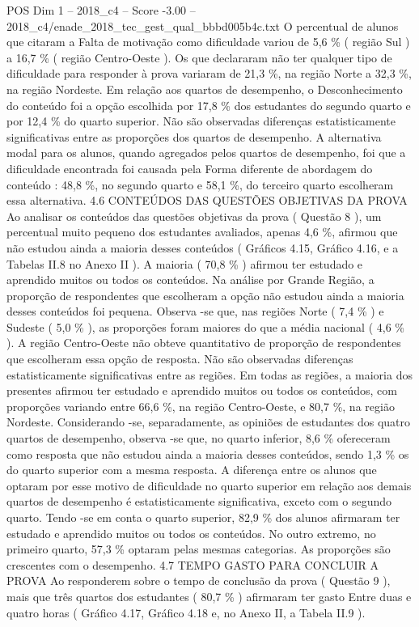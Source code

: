 \begin{textsample}{POS Dim 1 – 2018\_c4 – Score -3.00 – 2018\_c4/enade\_2018\_tec\_gest\_qual\_bbbd005b4c.txt}
O percentual de alunos que citaram a Falta de motivação como dificuldade variou de 5,6 \% ( região Sul ) a 16,7 \% ( região Centro-Oeste ).
Os que declararam não ter qualquer tipo de dificuldade para responder à prova variaram de 21,3 \%, na região Norte a 32,3 \%, na região Nordeste.
Em relação aos quartos de desempenho, o Desconhecimento do conteúdo foi a opção escolhida por 17,8 \% dos estudantes do segundo quarto e por 12,4 \% do quarto superior.
Não são observadas diferenças estatisticamente significativas entre as proporções dos quartos de desempenho.
A alternativa modal para os alunos, quando agregados pelos quartos de desempenho, foi que a dificuldade encontrada foi causada pela Forma diferente de abordagem do conteúdo : 48,8 \%, no segundo quarto e 58,1 \%, do terceiro quarto escolheram essa alternativa. 4.6 CONTEÚDOS DAS QUESTÕES OBJETIVAS DA PROVA Ao analisar os conteúdos das questões objetivas da prova ( Questão 8 ), um percentual muito pequeno dos estudantes avaliados, apenas 4,6 \%, afirmou que não estudou ainda a maioria desses conteúdos ( Gráficos 4.15, Gráfico 4.16, e a Tabelas II.8 no Anexo II ).
A maioria ( 70,8 \% ) afirmou ter estudado e aprendido muitos ou todos os conteúdos.
Na análise por Grande Região, a proporção de respondentes que escolheram a opção não estudou ainda a maioria desses conteúdos foi pequena.
Observa -se que, nas regiões Norte ( 7,4 \% ) e Sudeste ( 5,0 \% ), as proporções foram maiores do que a média nacional ( 4,6 \% ).
A região Centro-Oeste não obteve quantitativo de proporção de respondentes que escolheram essa opção de resposta.
Não são observadas diferenças estatisticamente significativas entre as regiões.
Em todas as regiões, a maioria dos presentes afirmou ter estudado e aprendido muitos ou todos os conteúdos, com proporções variando entre 66,6 \%, na região Centro-Oeste, e 80,7 \%, na região Nordeste.
Considerando -se, separadamente, as opiniões de estudantes dos quatro quartos de desempenho, observa -se que, no quarto inferior, 8,6 \% ofereceram como resposta que não estudou ainda a maioria desses conteúdos, sendo 1,3 \% os do quarto superior com a mesma resposta.
A diferença entre os alunos que optaram por esse motivo de dificuldade no quarto superior em relação aos demais quartos de desempenho é estatisticamente significativa, exceto com o segundo quarto.
Tendo -se em conta o quarto superior, 82,9 \% dos alunos afirmaram ter estudado e aprendido muitos ou todos os conteúdos.
No outro extremo, no primeiro quarto, 57,3 \% optaram pelas mesmas categorias.
As proporções são crescentes com o desempenho. 4.7 TEMPO GASTO PARA CONCLUIR A PROVA Ao responderem sobre o tempo de conclusão da prova ( Questão 9 ), mais que três quartos dos estudantes ( 80,7 \% ) afirmaram ter gasto Entre duas e quatro horas ( Gráfico 4.17, Gráfico 4.18 e, no Anexo II, a Tabela II.9 ).

\end{textsample}
